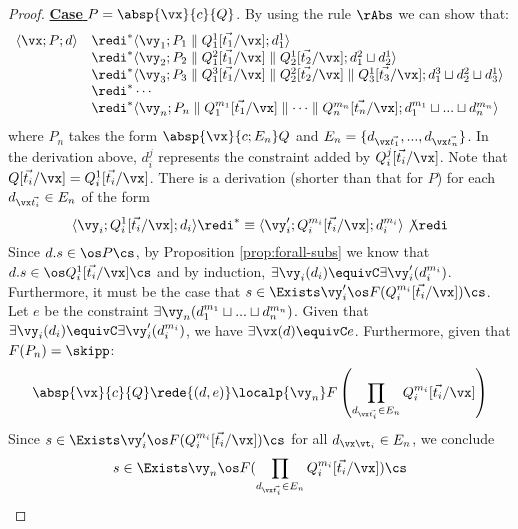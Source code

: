 \documentclass{tlp}
\begin{document}
\begin{proof}
\noindent \underline{{\bf Case}  $P = \absp{\vx}{c}{Q}$}.   
By using the rule $\rAbs$ we can show that:
	 \[
\begin{array}{ll}
\langle \vx; P ; d\rangle & \redi^*   \langle \vy_1; P_1 \parallel Q_1^1[\vec{t_1}/\vx] ;   d_1^1\rangle \\
  & \redi^*   \langle \vy_2; P_2 \parallel Q_1^2[\vec{t_1}/\vx] \parallel Q_2^1[\vec{t_2}/\vx] ; d_1^2 \sqcup  d_2^1\rangle \\
 & \redi^*   \langle \vy_3 ; P_3 \parallel Q_1^3[\vec{t_1}/\vx] \parallel Q_2^2[\vec{t_2}/\vx] \parallel Q_3^1[\vec{t_3}/\vx] ;  d_1^3 \sqcup d_2^2 \sqcup d_3^1\rangle \\
  & \redi^*  \cdots \\
 & \redi^*   \langle \vy_n; P_n \parallel Q_1^{m_1}[\vec{t_1}/\vx] \parallel \cdots \parallel  Q_n^{m_n}[\vec{t_n}/\vx] ; d_1^{m_1} \sqcup ... \sqcup d_n^{m_n}\rangle 
 \end{array}
\]
where $P_n$ takes the form 
$\absp{\vx}{c;E_n}Q$ and $E_n = \{d_{\vx\vec{t_1}},...,d_{\vx\vec{t_n}}\}$.
In the derivation above,  $d_i^j$ represents the constraint  added by  $Q_i^j[\vec{t_i}/\vx]$. Note that  $Q[\vec{t_i}/\vx]=Q_i^1[\vec{t_i}/\vx]$.  There is a derivation (shorter than that for $P$) for each $d_{\vx\vec{t_i}} \in E_n$ of the form
\[
\langle \vy_i; Q_i^1[\vec{t_i}/\vx];d_i \rangle \redi^*  \equiv
\langle \vy_i'; Q_i^{m_i}[\vec{t_i}/\vx];  d_i^{m_i}\rangle \not\redi
\]
Since $d.s \in \os P\cs$, by Proposition \ref{prop:forall-subs} we know that  $d.s \in \os Q_i^1[\vec{t_i}/\vx] \cs$ and by induction,  $ \exists \vy_i(d_i) \equivC \exists \vy_i' ( d_i^{m_i})$. Furthermore,   it must be the case that $s\in \Exists \vy_i' \os F(Q_i^{m_i}[\vec{t_i}/\vx])\cs$. 
Let $e$ be the constraint $\exists \vy_n( d_1^{m_1} \sqcup ... \sqcup d_n^{m_n})$.  Given that $ \exists \vy_i(d_i) \equivC \exists \vy_i' ( d_i^{m_i})$, we have $\exists \vx(d) \equivC e$. Furthermore, given that  $F(P_n) = \skipp$:
\[
\absp{\vx}{c}{Q}\rede{(d,e)} \localp{\vy_n}F\left(\prod\limits_{d_{\vx\vec{t_i}} \in E_n} Q_i^{m_i}[\vec{t_i}/\vx]\right)
\]
Since  $s\in \Exists \vy_i' \os F(Q_i^{m_i}[\vec{t_i}/\vx])\cs$
for all $d_{\vx\vt_i} \in E_n$,   we conclude 
\[s \in \Exists \vy_n\os F(\prod\limits_{d_{\vx\vec{t_i}} \in E_n} Q_i^{m_i}[\vec{t_i}/\vx])\cs\]




	  









\end{proof}
\end{document}
